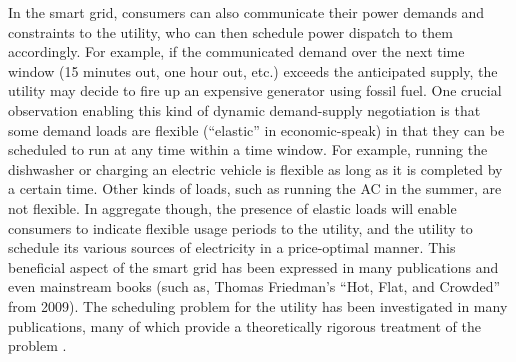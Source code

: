 \documentclass[conference]{IEEEtran}
\begin{document}
In the smart grid, consumers can also communicate their power demands and constraints to the utility, who can then schedule
power dispatch to them accordingly.  For example, if the communicated demand over the next time window (15 minutes out, one hour out, etc.) exceeds the anticipated supply, the utility may decide to fire up an expensive generator using fossil fuel. One crucial observation enabling this kind of dynamic demand-supply negotiation is that some demand loads are flexible (``elastic'' in economic-speak) in that they can be scheduled to run at any time within a time window. For example, running the dishwasher or charging an electric vehicle is flexible as long as it is completed by a certain time. Other kinds of loads, such as running the AC in the summer, are not flexible. In aggregate though, the presence of elastic loads will enable consumers to indicate flexible usage periods to the utility, and the utility to schedule its various sources of electricity in a price-optimal manner. This beneficial aspect of the smart grid has been expressed in many publications and even mainstream books (such as, Thomas Friedman's ``Hot, Flat, and Crowded'' from 2009). The scheduling problem for the utility has been investigated in many publications, many of which provide a theoretically rigorous treatment of the problem \cite{pertersen2013taxonomy}. 

\end{document}
